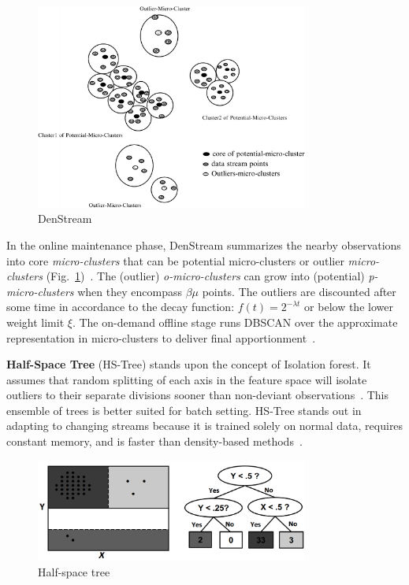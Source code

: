 \begin{figure}[ht]
    \centering
    \includegraphics[width=0.8\textwidth]{assets/analysis/DenStream.png}
    \caption{DenStream~\cite{amini_density_2012}}
    \label{fig:denstream}
\end{figure}

In the online maintenance phase, DenStream summarizes the nearby observations into core \emph{micro-clusters} that can be potential micro-clusters or outlier \emph{micro-clusters} (Fig.~\ref{fig:denstream})~\cite{ghesmoune_state---art_2016}. The (outlier) \emph{o-micro-clusters} can grow into (potential) \emph{p-micro-clusters} when they encompass $\beta \mu$ points. The outliers are discounted after some time in accordance to the decay function: $f(t) = 2^{-\lambda t}$ or below the lower weight limit $\xi$. The on-demand offline stage runs DBSCAN over the approximate representation in micro-clusters to deliver final apportionment~\cite{cao_density-based_2006}.
\bigbreak

\textbf{Half-Space Tree} (HS-Tree) stands upon the concept of Isolation forest. It assumes that random splitting of each axis in the feature space will isolate outliers to their separate divisions sooner than non-deviant observations~\cite{gervasi_anomaly_2020, torres_automatic_2022}. This ensemble of trees is better suited for batch setting. HS-Tree stands out in adapting to changing streams because it is trained solely on normal data, requires constant memory, and is faster than density-based methods~\cite{tan_fast_2011}.

\begin{figure}[ht]
    \centering
    \includegraphics[width=0.8\textwidth]{assets/analysis/HS-Tree.png}
    \caption{Half-space tree~\cite{tan_fast_2011}}
\end{figure}

